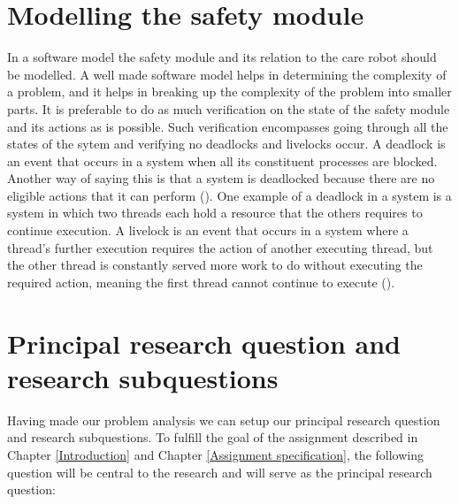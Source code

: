 \documentclass[12pt]{scrreprt}
\begin{document}
\section{Modelling the safety module}
\label{Modelling the safety module}

In a software model the safety module and its relation to the care robot should be modelled. A well made software model helps in determining the complexity of a problem, and it helps in breaking up the complexity of the problem into smaller parts. It is preferable to do as much verification on the state of the safety module and its actions as is possible. Such verification encompasses going through all the states of the sytem and verifying no deadlocks and livelocks occur.
A deadlock is an event that occurs in a system when all its constituent processes are blocked. Another way of saying this is that a system is deadlocked because there are no eligible actions that it can perform (\cite{ltsa}). One example of a deadlock in a system is a system in which two threads each hold a resource that the others requires to continue execution. A livelock is an event that occurs in a system where a thread's further execution requires the action of another executing thread, but the other thread is constantly served more work to do without executing the required action, meaning the first thread cannot continue to execute (\cite{livelock_starvation}).
\par

\section{Principal research question and research subquestions}
\label{Principal research question and research subquestions}
Having made our problem analysis we can setup our principal research question and research subquestions. To fulfill the goal of the assignment described in Chapter \ref{Introduction} and Chapter \ref{Assignment specification}, the following question will be central to the research and will serve as the principal research question:
\end{document}
